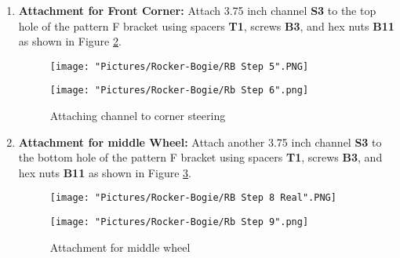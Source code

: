 \documentclass[12pt]{article}
\begin{document}
\begin{enumerate}
\begin{figure}[H]
  \centering
  \begin{minipage}[b]{0.45\textwidth}
    \texttt{[image: "Pictures/Rocker-Bogie/RB Step 3".PNG]}
  \end{minipage}
  \hfill
  \begin{minipage}[b]{0.45\textwidth}
    \texttt{[image: "Pictures/Rocker-Bogie/RB Step 4".PNG]}
  \end{minipage}
  \caption{Start Rocker-Bogie pivot joint}
  \label{RB2}
\end{figure}




\item \textbf{Attachment for Front Corner:} Attach 3.75 inch channel \textbf{S3} to the top hole of the pattern F bracket using spacers \textbf{T1}, screws \textbf{B3}, and hex nuts \textbf{B11} as shown in Figure \ref{attaching channel corner}.

\begin{figure}[H]
  \centering
  \begin{minipage}[b]{0.45\textwidth}
    \texttt{[image: "Pictures/Rocker-Bogie/RB Step 5".PNG]}
  \end{minipage}
  \hfill
  \begin{minipage}[b]{0.45\textwidth}
    \texttt{[image: "Pictures/Rocker-Bogie/Rb Step 6".png]}
  \end{minipage}
  \caption{Attaching channel to corner steering}
  \label{attaching channel corner}
\end{figure}


\item \textbf{Attachment for middle Wheel:} Attach another 3.75 inch channel \textbf{S3} to the bottom hole of the pattern F bracket using spacers \textbf{T1}, screws \textbf{B3}, and hex nuts \textbf{B11} as shown in Figure \ref{attaching middle wheel}.

\begin{figure}[H]
  \centering
  \begin{minipage}[b]{0.45\textwidth}
    \texttt{[image: "Pictures/Rocker-Bogie/RB Step 8 Real".PNG]}
  \end{minipage}
  \hfill
  \begin{minipage}[b]{0.45\textwidth}
    \texttt{[image: "Pictures/Rocker-Bogie/Rb Step 9".png]}
  \end{minipage}
  \caption{Attachment for middle wheel}
  \label{attaching middle wheel}
\end{figure}



\end{enumerate}
\end{document}
